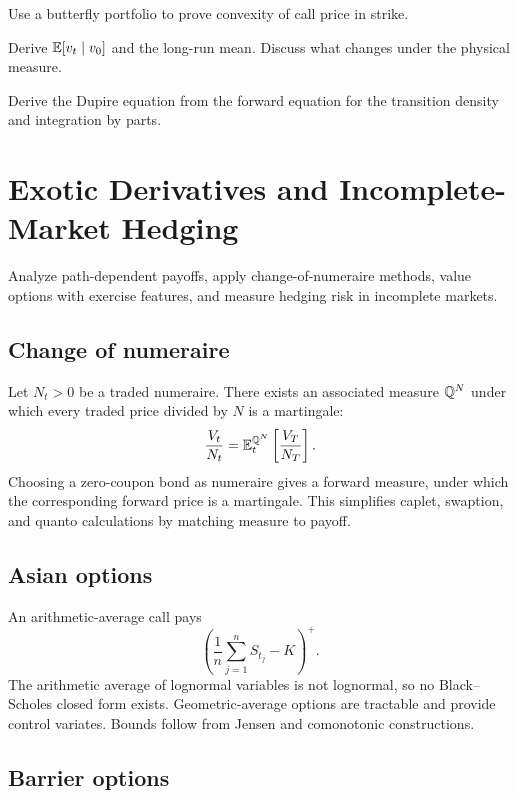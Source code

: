 \begin{exercise}
Use a butterfly portfolio to prove convexity of call price in strike.
\end{exercise}
\begin{exercise}
Derive $\operatorname{\mathbb E}[v_t\mid v_0]$ and the long-run mean. Discuss what changes under the
physical measure.
\end{exercise}
\begin{exercise}
Derive the Dupire equation from the forward equation for the transition density and
integration by parts.
\end{exercise}


\chapter{Exotic Derivatives and Incomplete-Market Hedging}

\begin{objectives}
Analyze path-dependent payoffs, apply change-of-numeraire methods, value options with
exercise features, and measure hedging risk in incomplete markets.
\end{objectives}

\section{Change of numeraire}

Let $N_t>0$ be a traded numeraire. There exists an associated measure $\mathbb Q^N$ under
which every traded price divided by $N$ is a martingale:
\[
\frac{V_t}{N_t}=
\operatorname{\mathbb E}_t^{\mathbb Q^N}\left[\frac{V_T}{N_T}\right].
\]
Choosing a zero-coupon bond as numeraire gives a forward measure, under which the
corresponding forward price is a martingale. This simplifies caplet, swaption, and
quanto calculations by matching measure to payoff.

\section{Asian options}

An arithmetic-average call pays
\[
\left(\frac1n\sum_{j=1}^nS_{t_j}-K\right)^+.
\]
The arithmetic average of lognormal variables is not lognormal, so no Black--Scholes
closed form exists. Geometric-average options are tractable and provide control
variates. Bounds follow from Jensen and comonotonic constructions.

\section{Barrier options}


